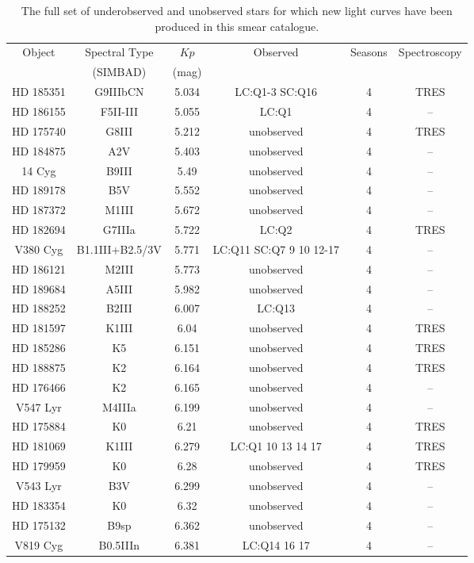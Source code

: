 \begin{table*}
\caption{The full set of underobserved and unobserved stars for which new light curves have been produced in this smear catalogue.\label{all_stars}\label{all_stars}}
\begin{tabular}{cccccc}
\hline \hline
Object & Spectral Type & $Kp$ & Observed & Seasons & Spectroscopy \\
 & (SIMBAD) & (mag) &  &  &  \\
\hline
HD 185351 & G9IIIbCN & 5.034 & LC:Q1-3 SC:Q16 & 4 & TRES \\
HD 186155 & F5II-III & 5.055 & LC:Q1 & 4 & -- \\
HD 175740 & G8III & 5.212 & unobserved & 4 & TRES \\
HD 184875 & A2V & 5.403 & unobserved & 4 & -- \\
14 Cyg & B9III & 5.49 & unobserved & 4 & -- \\
HD 189178 & B5V & 5.552 & unobserved & 4 & -- \\
HD 187372 & M1III & 5.672 & unobserved & 4 & -- \\
HD 182694 & G7IIIa & 5.722 & LC:Q2 & 4 & TRES \\
V380 Cyg & B1.1III+B2.5/3V & 5.771 & LC:Q11 SC:Q7 9 10 12-17 & 4 & -- \\
HD 186121 & M2III & 5.773 & unobserved & 4 & -- \\
HD 189684 & A5III & 5.982 & unobserved & 4 & -- \\
HD 188252 & B2III & 6.007 & LC:Q13 & 4 & -- \\
HD 181597 & K1III & 6.04 & unobserved & 4 & TRES \\
HD 185286 & K5 & 6.151 & unobserved & 4 & TRES \\
HD 188875 & K2 & 6.164 & unobserved & 4 & TRES \\
HD 176466 & K2 & 6.165 & unobserved & 4 & -- \\
V547 Lyr & M4IIIa & 6.199 & unobserved & 4 & -- \\
HD 175884 & K0 & 6.21 & unobserved & 4 & TRES \\
HD 181069 & K1III & 6.279 & LC:Q1 10 13 14 17 & 4 & TRES \\
HD 179959 & K0 & 6.28 & unobserved & 4 & TRES \\
V543 Lyr & B3V & 6.299 & unobserved & 4 & -- \\
HD 183354 & K0 & 6.32 & unobserved & 4 & -- \\
HD 175132 & B9sp & 6.362 & unobserved & 4 & -- \\
V819 Cyg & B0.5IIIn & 6.381 & LC:Q14 16 17 & 4 & -- \\

\end{tabular}
\end{table*}
